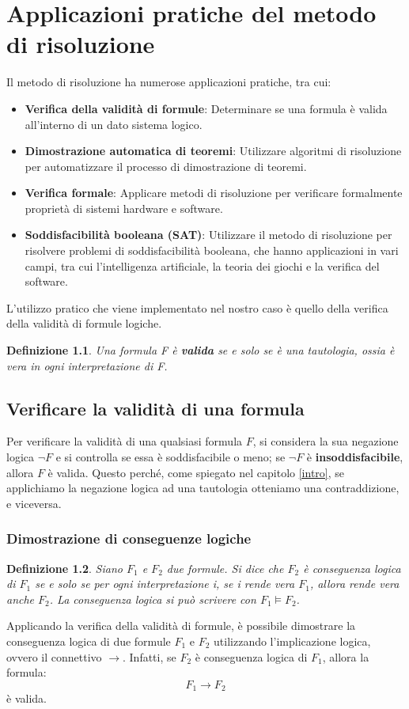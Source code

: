 \documentclass[a4paper,12pt]{report}
\newtheorem{definition}{Definizione}[section]
\begin{document}
\chapter{Applicazioni pratiche del metodo di risoluzione}
\label{app}
Il metodo di risoluzione ha numerose applicazioni pratiche, tra cui:
\begin{itemize}
    \item \textbf{Verifica della validità di formule}: Determinare se una formula è valida all'interno di un dato sistema logico.
    \item \textbf{Dimostrazione automatica di teoremi}: Utilizzare algoritmi di risoluzione per automatizzare il processo di dimostrazione di teoremi.
    \item \textbf{Verifica formale}: Applicare metodi di risoluzione per verificare formalmente proprietà di sistemi hardware e software.
    \item \textbf{Soddisfacibilità booleana (SAT)}: Utilizzare il metodo di risoluzione per risolvere problemi di soddisfacibilità booleana, che hanno applicazioni in vari campi, tra cui l'intelligenza artificiale, la teoria dei giochi e la verifica del software.
\end{itemize}
L'utilizzo pratico che viene implementato nel nostro caso è quello della verifica della validità di formule logiche.

\begin{definition}
    Una formula F è \textbf{valida} se e solo se è una tautologia, ossia è vera in ogni interpretazione di F.
\end{definition}

\section{Verificare la validità di una formula}
Per verificare la validità di una qualsiasi formula $F$, si considera la sua negazione logica $\lnot F$ e si controlla se essa è soddisfacibile o meno; se $\lnot F$ è \textbf{insoddisfacibile}, allora $F$ è valida. Questo perché, come spiegato nel capitolo \ref{intro}, se applichiamo la negazione logica ad una tautologia otteniamo una contraddizione, e viceversa.

\subsection{Dimostrazione di conseguenze logiche}

\begin{definition}
    Siano $F_1$ e $F_2$ due formule. Si dice che $F_2$ è conseguenza logica di $F_1$ se e solo se per ogni interpretazione i, se i rende vera $F_1$, allora rende vera anche $F_2$. La conseguenza logica si può scrivere con $F_1 \models F_2$.
\end{definition}
Applicando la verifica della validità di formule, è possibile dimostrare la conseguenza logica di due formule $F_1$ e $F_2$ utilizzando l'implicazione logica, ovvero il connettivo $\to$. Infatti, se $F_2$ è conseguenza logica di $F_1$, allora la formula:
\[
    F_1 \to F_2
\]
è valida.
\end{document}
